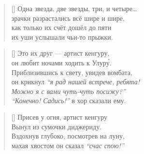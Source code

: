 \documentclass[14pt]{memoir}
\begin{document}
\begin{verse}[\versewidth]
Одна звезда, две звезды, три, и четыре\ldots\\
зрачки разрастались всё шире и шире,\\
как только их счёт дошёл до пяти\\
их уши услышали чьи-то прыжки.
\end{verse}

\begin{verse}[\versewidth]
Это их друг --- артист кенгуру,\\
он любит ночами ходить к Улур\'{у}.\\
Приблизившись к свету, увидев вомбата,\\
он крикнул \emph{``я рад нашей встрече, ребята!\\
Можно я с вами чуть-чуть посижу?''}\\
\emph{``Конечно! Садись!''} в хор сказали ему.
\end{verse}

\begin{verse}[\versewidth]
Присев у огня, артист кенгуру\\
Вынул из сумочки диджериду.\\
Вздохнув глубоко, посмотрев на луну,\\
махая хвостом он сказал \emph{``счас спою!''}
\end{verse}




\newpage
\hfill
\end{document}
